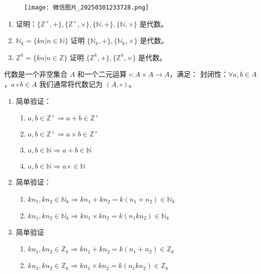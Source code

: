 \begin{figure}[H]
\centering
\texttt{[image: 微信图片\_20250301233728.png]}
\label{}
\end{figure}

\begin{exercise}
\begin{enumerate}
		\item 证明：$\{ \mathbb{Z}^{+},+ \},\{ \mathbb{Z}^{+},\times \},\{ \mathbb{N},+ \},\{ \mathbb{N},\times \}$ 是代数。
		\item $\mathbb{N}_{k}=\{ kn|n\in \mathbb{N} \}$ 证明 $\{ \mathbb{N}_{k},+ \},\{ \mathbb{N}_{k},\times \}$ 是代数。
		\item $\mathbb{Z}^{k}=\{ kn|n\in \mathbb{Z} \}$ 证明 $\{ \mathbb{Z}^{k},+ \},\{ \mathbb{Z}^{k},\times \}$ 是代数。
	\end{enumerate}
\end{exercise}
\begin{definition}[代数]
代数是一个非空集合 $A$ 和一个二元运算 $\circ: A \times A \to A$，满足：
封闭性：$\forall a, b \in A$，$a \circ b \in A$
我们通常将代数记为 $(A, \circ)$。
\end{definition}
\begin{enumerate}
	\item 简单验证：
	\begin{enumerate}
		\item $a, b\in \mathbb{Z}^{+}\Rightarrow a+b\in \mathbb{Z}^{+}$
		\item $a, b\in \mathbb{Z}^{+}\Rightarrow a\times b\in \mathbb{Z}^{+}$
		\item $a, b\in \mathbb{N}\Rightarrow a+b\in \mathbb{N}$
		\item $a, b\in \mathbb{N}\Rightarrow a\times\in \mathbb{N}$
	\end{enumerate}
	\item 简单验证：
	\begin{enumerate}
		\item $kn_{1}, kn_{2}\in \mathbb{N}_{k}\Rightarrow kn_{1}+kn_{2}=k (n_{1}+n_{2})\in \mathbb{N}_{k}$
		\item $kn_{1}, kn_{2}\in \mathbb{N}_{k}\Rightarrow kn_{1}\times kn_{2}=k (n_{1}kn_{2})\in \mathbb{N}_{k}$
	\end{enumerate}
	\item 简单验证
	\begin{enumerate}
		\item $kn_{1}, kn_{2}\in \mathbb{Z}_{k}\Rightarrow kn_{1}+kn_{2}=k (n_{1}+n_{2})\in \mathbb{Z}_{k}$
		\item $kn_{1}, kn_{2}\in \mathbb{Z}_{k}\Rightarrow kn_{1}\times kn_{2}=k (n_{1}kn_{2})\in \mathbb{Z}_{k}$
	\end{enumerate}
\end{enumerate}

